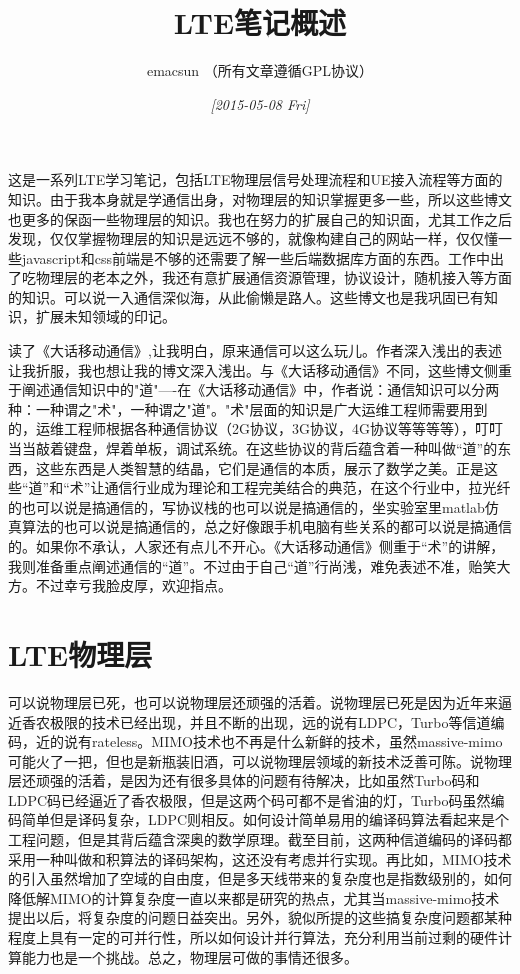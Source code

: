 \documentclass[10pt,a4paper,UTF8]{article}
\author{emacsun （所有文章遵循GPL协议）}
\date{\textit{[2015-05-08 Fri]}}
\title{LTE笔记概述}
\begin{document}
\maketitle\xiaosihao
\tableofcontents\newpage\newpage

这是一系列LTE学习笔记，包括LTE物理层信号处理流程和UE接入流程等方面的知识。由于我本身就是学通信出身，对物理层的知识掌握更多一些，所以这些博文也更多的保函一些物理层的知识。我也在努力的扩展自己的知识面，尤其工作之后发现，仅仅掌握物理层的知识是远远不够的，就像构建自己的网站一样，仅仅懂一些javascript和css前端是不够的还需要了解一些后端数据库方面的东西。工作中出了吃物理层的老本之外，我还有意扩展通信资源管理，协议设计，随机接入等方面的知识。可以说一入通信深似海，从此偷懒是路人。这些博文也是我巩固已有知识，扩展未知领域的印记。

读了《大话移动通信》,让我明白，原来通信可以这么玩儿。作者深入浅出的表述让我折服，我也想让我的博文深入浅出。与《大话移动通信》不同，这些博文侧重于阐述通信知识中的"道"----在《大话移动通信》中，作者说：通信知识可以分两种：一种谓之"术"，一种谓之"道"。"术"层面的知识是广大运维工程师需要用到的，运维工程师根据各种通信协议（2G协议，3G协议，4G协议等等等等），叮叮当当敲着键盘，焊着单板，调试系统。在这些协议的背后蕴含着一种叫做“道”的东西，这些东西是人类智慧的结晶，它们是通信的本质，展示了数学之美。正是这些“道”和“术”让通信行业成为理论和工程完美结合的典范，在这个行业中，拉光纤的也可以说是搞通信的，写协议栈的也可以说是搞通信的，坐实验室里matlab仿真算法的也可以说是搞通信的，总之好像跟手机电脑有些关系的都可以说是搞通信的。如果你不承认，人家还有点儿不开心。《大话移动通信》侧重于“术”的讲解，我则准备重点阐述通信的“道”。不过由于自己“道”行尚浅，难免表述不准，贻笑大方。不过幸亏我脸皮厚，欢迎指点。


\section{LTE物理层}
\label{sec:orgheadline1}


可以说物理层已死，也可以说物理层还顽强的活着。说物理层已死是因为近年来逼近香农极限的技术已经出现，并且不断的出现，远的说有LDPC，Turbo等信道编码，近的说有rateless。MIMO技术也不再是什么新鲜的技术，虽然massive-mimo可能火了一把，但也是新瓶装旧酒，可以说物理层领域的新技术泛善可陈。说物理层还顽强的活着，是因为还有很多具体的问题有待解决，比如虽然Turbo码和LDPC码已经逼近了香农极限，但是这两个码可都不是省油的灯，Turbo码虽然编码简单但是译码复杂，LDPC则相反。如何设计简单易用的编译码算法看起来是个工程问题，但是其背后蕴含深奥的数学原理。截至目前，这两种信道编码的译码都采用一种叫做和积算法的译码架构，这还没有考虑并行实现。再比如，MIMO技术的引入虽然增加了空域的自由度，但是多天线带来的复杂度也是指数级别的，如何降低解MIMO的计算复杂度一直以来都是研究的热点，尤其当massive-mimo技术提出以后，将复杂度的问题日益突出。另外，貌似所提的这些搞复杂度问题都某种程度上具有一定的可并行性，所以如何设计并行算法，充分利用当前过剩的硬件计算能力也是一个挑战。总之，物理层可做的事情还很多。
\end{document}
